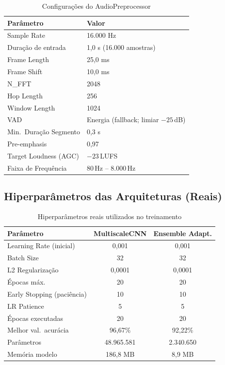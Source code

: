 \documentclass[12pt,a4paper]{article}
\begin{document}
\begin{table}[H]
\centering
\caption{Configura\c{c}\~{o}es do AudioPreprocessor}
\begin{tabular}{ll}
\toprule
\textbf{Par\^{a}metro} & \textbf{Valor} \\
\midrule
Sample Rate            & 16.000 Hz \\
Dura\c{c}\~{a}o de entrada & 1,0 s (16.000 amostras) \\
Frame Length           & 25,0 ms \\
Frame Shift            & 10,0 ms \\
N\_FFT                 & 2048 \\
Hop Length             & 256 \\
Window Length          & 1024 \\
VAD                    & Energia (fallback; limiar $-25$\,dB) \\
Min.\ Dura\c{c}\~{a}o Segmento & 0,3 s \\
Pre-emphasis           & 0,97 \\
Target Loudness (AGC)  & $-23$\,LUFS \\
Faixa de Frequ\^{e}ncia & 80\,Hz -- 8.000\,Hz \\
\bottomrule
\end{tabular}
\end{table}

\subsection{Hiperpar\^{a}metros das Arquiteturas (Reais)}

\begin{table}[H]
\centering
\caption{Hiperpar\^{a}metros reais utilizados no treinamento}
\small
\begin{tabular}{lcc}
\toprule
\textbf{Par\^{a}metro} & \textbf{MultiscaleCNN} & \textbf{Ensemble Adapt.} \\
\midrule
Learning Rate (inicial)        & 0,001 & 0,001 \\
Batch Size                     & 32 & 32 \\
L2 Regulariza\c{c}\~{a}o      & 0,0001 & 0,0001 \\
\'{E}pocas m\'{a}x.\           & 20 & 20 \\
Early Stopping (paci\^{e}ncia) & 10 & 10 \\
LR Patience                    & 5 & 5 \\
\'{E}pocas executadas          & 20 & 20 \\
Melhor val.\ acur\'{a}cia      & 96,67\% & 92,22\% \\
Par\^{a}metros                 & 48.965.581 & 2.340.650 \\
Mem\'{o}ria modelo             & 186,8 MB & 8,9 MB \\
\bottomrule
\end{tabular}
\end{table}
\end{document}
